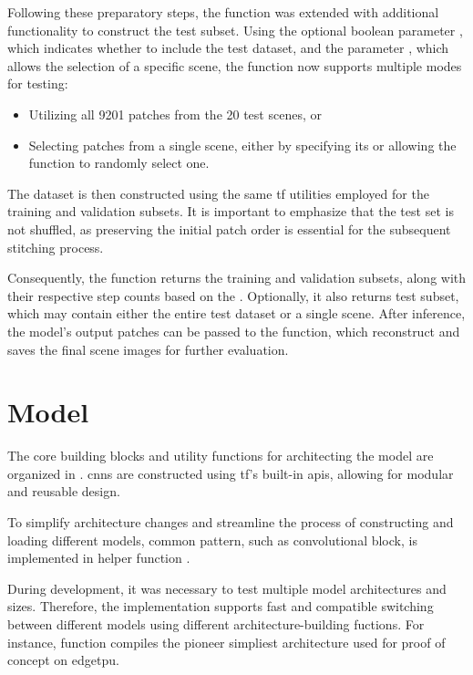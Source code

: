 {Following these preparatory steps, the  function was extended with additional functionality to construct the test subset.
Using the optional boolean parameter , which indicates whether to include the test dataset, and the parameter ,
which allows the selection of a specific scene, the function now supports multiple modes for testing:

\begin{itemize}
    \item Utilizing all 9201 patches from the 20 test scenes, or
    \item Selecting patches from a single scene, either by specifying its  or allowing the function to randomly select one.
\end{itemize}

The dataset is then constructed using the same \gls{tf} utilities employed for the training and validation subsets.
It is important to emphasize that the test set is not shuffled, as preserving the initial patch order is essential for the subsequent stitching process.

Consequently, the  function returns the training and validation subsets, along with their respective step counts based on the .
Optionally, it also returns test subset, which may contain either the entire test dataset or a single scene.
After inference, the model's output patches can be passed to the  function, which reconstruct and saves the final scene images for further evaluation.

\section{Model}

The core building blocks and utility functions for architecting the model are organized in .
\glspl{cnn} are constructed using \gls{tf}'s built-in \glspl{api}, allowing for modular and reusable design.

To simplify architecture changes and streamline the process of constructing and loading different models,
common pattern, such as convolutional block, is implemented in helper function .

During development, it was necessary to test multiple model architectures and sizes.
Therefore, the implementation supports fast and compatible switching between different models using different architecture-building fuctions.
For instance,  function compiles the pioneer simpliest  architecture used for proof of concept on \gls{edgetpu}.

}
